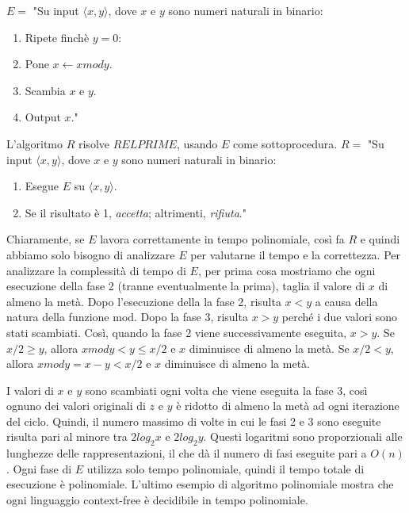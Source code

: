 \documentclass{article}
\begin{document}
\text{}
\newline
$E =$ "Su input $\langle x, y \rangle$, dove $x$ e $y$ sono numeri naturali in binario:
\begin{enumerate}
    \item Ripete finchè $y = 0$:
    \item \quad Pone $x \leftarrow x mod y$.
    \item \quad Scambia $x$ e $y$.
    \item Output $x$."
\end{enumerate}
L'algoritmo $R$ risolve $RELPRIME$, usando $E$ come sottoprocedura.
\newline
$R =$ "Su input $\langle x, y \rangle$, dove $x$ e $y$ sono numeri naturali in binario:
\begin{enumerate}
    \item Esegue $E$ su $\langle x, y \rangle$.
    \item Se il risultato è 1, \textit{accetta}; altrimenti, \textit{rifiuta}."
\end{enumerate}
Chiaramente, se $E$ lavora correttamente in tempo polinomiale, così fa $R$ e quindi abbiamo solo bisogno di analizzare $E$ per valutarne il tempo e la correttezza.
Per analizzare la complessità di tempo di $E$, per prima cosa mostriamo che ogni esecuzione della fase 2 (tranne eventualmente la prima), taglia il valore di $x$ di almeno la metà.
Dopo l'esecuzione della la fase 2, risulta $x < y$ a causa della natura della funzione mod.
Dopo la fase 3, risulta $x > y$ perché i due valori sono stati scambiati.
Così, quando la fase 2 viene successivamente eseguita, $x > y$.
Se $x/2 \geq y$, allora $x mod y < y \leq x/2$ e $x$ diminuisce di almeno la metà.
Se $x/2 < y$, allora $x mod y = x - y < x/2$ e $x$ diminuisce di almeno la metà.

I valori di $x$ e $y$ sono scambiati ogni volta che viene eseguita la fase 3, così ognuno dei valori originali di $z$ e $y$ è ridotto di almeno la metà ad ogni iterazione del ciclo.
Quindi, il numero massimo di volte in cui le fasi 2 e 3 sono eseguite risulta pari al minore tra $2 log_2 x$ e $2 log_2 y$. 
Questi logaritmi sono proporzionali alle lunghezze delle rappresentazioni, il che dà il numero di fasi eseguite pari a $O(n)$. 
Ogni fase di $E$ utilizza solo tempo polinomiale, quindi il tempo totale di esecuzione è polinomiale.
\vspace{1em}
\text{}
\newline
L'ultimo esempio di algoritmo polinomiale mostra che ogni linguaggio context-free è decidibile in tempo polinomiale.
\end{document}

